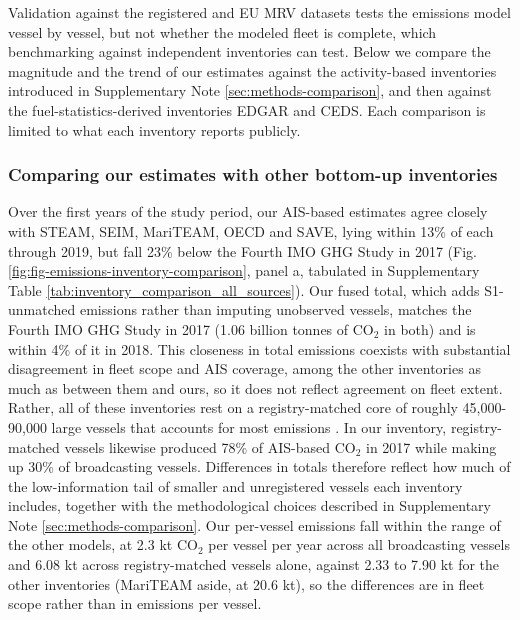 Validation against the registered and EU MRV datasets tests the emissions model vessel by vessel, but not whether the modeled fleet is complete, which benchmarking against independent inventories can test. Below we compare the magnitude and the trend of our estimates against the activity-based inventories introduced in Supplementary Note \ref{sec:methods-comparison}, and then against the fuel-statistics-derived inventories EDGAR and CEDS. Each comparison is limited to what each inventory reports publicly.

\subsubsection*{Comparing our estimates with other bottom-up inventories}

Over the first years of the study period, our AIS-based estimates agree closely with STEAM, SEIM, MariTEAM, OECD and SAVE, lying within 13\% of each through 2019, but fall 23\% below the Fourth IMO GHG Study in 2017 (Fig. \ref{fig:fig-emissions-inventory-comparison}, panel a, tabulated in Supplementary Table \ref{tab:inventory_comparison_all_sources}). Our fused total, which adds S1-unmatched emissions rather than imputing unobserved vessels, matches the Fourth IMO GHG Study in 2017 (1.06 billion tonnes of CO$_{2}$ in both) and is within 4\% of it in 2018. This closeness in total emissions coexists with substantial disagreement in fleet scope and AIS coverage, among the other inventories as much as between them and ours, so it does not reflect agreement on fleet extent. Rather, all of these inventories rest on a registry-matched core of roughly 45,000-90,000 large vessels that accounts for most emissions \cite{fourth2020greenhouse, yiHighresolutionGlobalShipping2025, oecdMaritimeTransportCO2Methodology2025, documentationV2025031Documentation, johanssonGlobalAssessmentShipping2017, kramelGlobalShippingEmissions2021}. In our inventory, registry-matched vessels likewise produced 78\% of AIS-based CO$_{2}$ in 2017 while making up 30\% of broadcasting vessels. Differences in totals therefore reflect how much of the low-information tail of smaller and unregistered vessels each inventory includes, together with the methodological choices described in Supplementary Note \ref{sec:methods-comparison}. Our per-vessel emissions fall within the range of the other models, at 2.3 kt CO$_{2}$ per vessel per year across all broadcasting vessels and 6.08 kt across registry-matched vessels alone, against 2.33 to 7.90 kt for the other inventories (MariTEAM aside, at 20.6 kt), so the differences are in fleet scope rather than in emissions per vessel.

